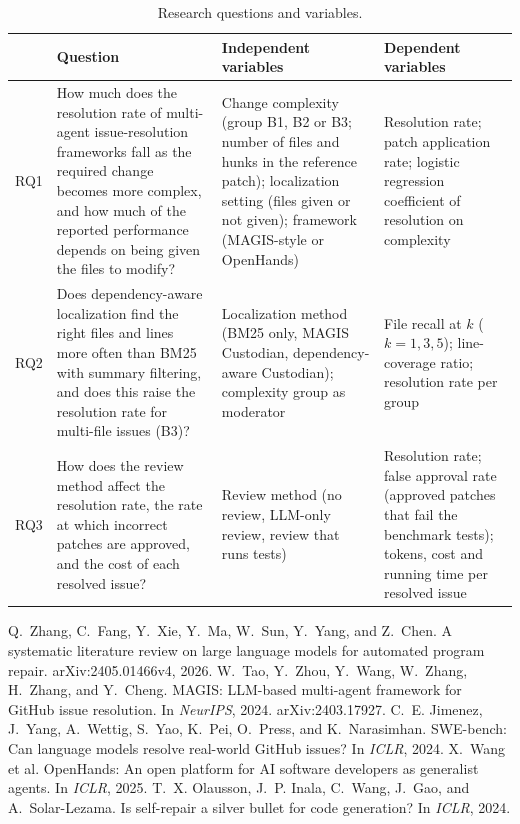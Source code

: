 \documentclass[10pt,a4paper]{article}
\begin{document}
\begin{table}[h]
\centering
\small
\caption{Research questions and variables.}
\label{tab:rq}
\renewcommand{\arraystretch}{1.15}
\begin{tabularx}{\textwidth}{@{}p{0.6cm}LLL@{}}
\toprule
 & Question & Independent variables & Dependent variables \\
\midrule
RQ1 & How much does the resolution rate of multi-agent issue-resolution frameworks fall as the required change becomes more complex, and how much of the reported performance depends on being given the files to modify? &
Change complexity (group B1, B2 or B3; number of files and hunks in the reference patch); localization setting (files given or not given); framework (MAGIS-style or OpenHands) &
Resolution rate; patch application rate; logistic regression coefficient of resolution on complexity \\
\addlinespace
RQ2 & Does dependency-aware localization find the right files and lines more often than BM25 with summary filtering, and does this raise the resolution rate for multi-file issues (B3)? &
Localization method (BM25 only, MAGIS Custodian, dependency-aware Custodian); complexity group as moderator &
File recall at $k$ ($k = 1, 3, 5$); line-coverage ratio; resolution rate per group \\
\addlinespace
RQ3 & How does the review method affect the resolution rate, the rate at which incorrect patches are approved, and the cost of each resolved issue? &
Review method (no review, LLM-only review, review that runs tests) &
Resolution rate; false approval rate (approved patches that fail the benchmark tests); tokens, cost and running time per resolved issue \\
\bottomrule
\end{tabularx}
\end{table}

\vspace{-4pt}
\begin{thebibliography}{9}
\setlength{\itemsep}{0pt}
\small
{} Q.~Zhang, C.~Fang, Y.~Xie, Y.~Ma, W.~Sun, Y.~Yang, and Z.~Chen. A systematic literature review on large language models for automated program repair. arXiv:2405.01466v4, 2026.
 W.~Tao, Y.~Zhou, Y.~Wang, W.~Zhang, H.~Zhang, and Y.~Cheng. MAGIS: LLM-based multi-agent framework for GitHub issue resolution. In \emph{NeurIPS}, 2024. arXiv:2403.17927.
 C.~E. Jimenez, J.~Yang, A.~Wettig, S.~Yao, K.~Pei, O.~Press, and K.~Narasimhan. SWE-bench: Can language models resolve real-world GitHub issues? In \emph{ICLR}, 2024.
 X.~Wang et al. OpenHands: An open platform for AI software developers as generalist agents. In \emph{ICLR}, 2025.
 T.~X. Olausson, J.~P. Inala, C.~Wang, J.~Gao, and A.~Solar-Lezama. Is self-repair a silver bullet for code generation? In \emph{ICLR}, 2024.
\end{thebibliography}
\end{document}
